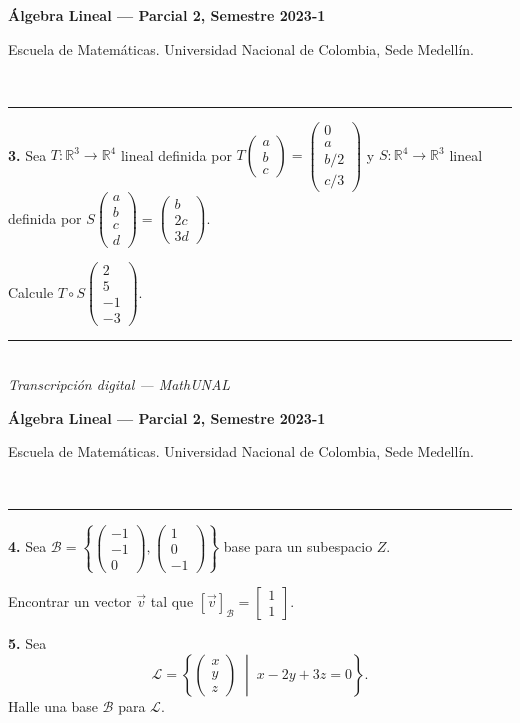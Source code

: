 \documentclass[11pt]{article}
\newcommand{\examheader}{%
  \noindent
  \begin{minipage}[t]{0.6\linewidth}
    {\small\bfseries Álgebra Lineal --- Parcial 2, Semestre 2023-1}\\
  \end{minipage}%
  \hfill
  \begin{minipage}[t]{0.35\linewidth}
    \raggedleft\small Escuela de Matemáticas. Universidad Nacional de Colombia, Sede Medellín.
  \end{minipage}\\[2pt]
  \rule{\linewidth}{0.6pt}
}
\newcommand{\examfooter}{%
  \vfill
  \rule{\linewidth}{0.4pt}\\[1pt]
  {\scriptsize\textit{Transcripción digital --- MathUNAL}\hfill\textcolor{unalblue}{\textbf{\thepage}}}
}
\begin{document}
\examheader

\textbf{3.} Sea $T:\mathbb{R}^3 \to \mathbb{R}^4$ lineal definida por $T\begin{pmatrix}a\\b\\c\end{pmatrix} = \begin{pmatrix}0\\a\\b/2\\c/3\end{pmatrix}$ y $S:\mathbb{R}^4 \to \mathbb{R}^3$ lineal definida por $S\begin{pmatrix}a\\b\\c\\d\end{pmatrix} = \begin{pmatrix}b\\2c\\3d\end{pmatrix}$.

Calcule $T \circ S\begin{pmatrix}2\\5\\-1\\-3\end{pmatrix}$.

\vspace{2cm}

\examfooter
\newpage

\examheader

\textbf{4.} Sea $\mathcal{B} = \left\{ \begin{pmatrix}-1\\-1\\0\end{pmatrix}, \begin{pmatrix}1\\0\\-1\end{pmatrix} \right\}$ base para un subespacio $Z$.

Encontrar un vector $\vec{v}$ tal que $[\vec{v}]_{\mathcal{B}} = \begin{bmatrix}1\\1\end{bmatrix}$.

\vspace{1.5cm}

\textbf{5.} Sea
\[
\mathcal{L} = \left\{ \begin{pmatrix}x\\y\\z\end{pmatrix} \;\middle|\; x-2y+3z=0 \right\}.
\]
Halle una base $\mathcal{B}$ para $\mathcal{L}$.
\end{document}
